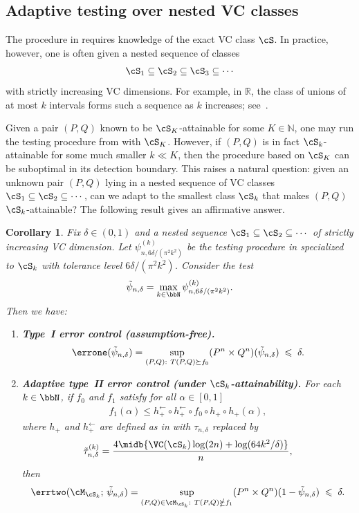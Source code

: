 \documentclass[english]{article}
\theoremstyle{plain}
\newtheorem{corollary}{Corollary}[section]
\theoremstyle{definition}
\newcommand{\hinv}{h_+^{\leftarrow}}
\newcommand{\Toff}[2]{T(#1,#2)}
\newcommand{\hupup}{h_+\mathbin{\circ}h_+}                 %
\newcommand{\hinvinv}{h_+^{\leftarrow}\mathbin{\circ}h_+^{\leftarrow}}  %
\newcommand{\fnull}{f_0}
\newcommand{\falt}{f_1}
\newcommand{\tauND}{\tau_{n,\delta}}               %
\newcommand{\hup}{h_+}                             %
\begin{document}
\subsection{Adaptive testing over nested VC classes}

The procedure in  requires knowledge of the exact VC
class \(\cS\). In practice, however, one is often given a nested sequence of
classes
\begin{align*}
\cS_1\subseteq\cS_2\subseteq \cS_3\subseteq\cdots
\end{align*}
with strictly increasing VC dimensions. For example, in \(\mathbb R\), the class of
unions of at most \(k\) intervals forms such a sequence as \(k\) increases; see~.

Given a pair \((P,Q)\) known to be \(\cS_K\)-attainable for some
\(K\in\mathbb N\), one may run the testing procedure from
 with \(\cS_K\). However, if \((P,Q)\) is in fact
\(\cS_k\)-attainable for some much smaller \(k\ll K\), then the procedure
based on \(\cS_K\) can be suboptimal in its detection boundary. This raises a
natural question: given an unknown pair \((P,Q)\) lying in a nested sequence of
VC classes \(\cS_1\subseteq\cS_2\subseteq\cdots\), can we adapt to the smallest
class \(\cS_k\) that makes \((P,Q)\) \(\cS_k\)-attainable? The following
result gives an affirmative answer.

\begin{corollary}\label{cor:adaptive}
Fix $\delta\in(0,1)$ and a nested sequence
$\cS_1\subseteq\cS_2\subseteq\cdots$ of strictly increasing VC dimension. Let
$\psi^{(k)}_{n,6\delta/(\pi^2k^2)}$ be the testing procedure in
 specialized to \(\cS_k\) with tolerance level
\(6\delta/(\pi^2k^2)\). Consider the test
\begin{align*}
\tilde{\psi}_{n,\delta}=\max_{k\in \bbN}\psi^{(k)}_{n,6\delta/(\pi^2k^2)}.
\end{align*}
Then we have:
\begin{enumerate}[label=(\roman*)]
\item \textbf{Type~I error control (assumption-free).}
\[
\errone(\tilde{\psi}_{n,\delta})
=
\sup_{(P,Q):\ \Toff{P}{Q}\succeq \fnull}
(P^n\times Q^n)(\tilde{\psi}_{n,\delta})
\;\leqslant\;
\delta.
\]

\item \textbf{Adaptive type~II error control (under $\cS_k$-attainability).}
For each \(k\in \bbN\), if \(\fnull\) and \(\falt\) satisfy for all
\(\alpha \in [0,1]\)
\begin{align*}
\falt(\alpha)\leqslant \hinvinv \circ \fnull\circ \hupup(\alpha),
\end{align*}
where \(\hup\) and \(\hinv\) are defined as in  with
\(\tauND\) replaced by
\begin{align*}
\tilde{\tau}^{(k)}_{n,\delta}
=
\frac{4\midb{\VC(\cS_k)\log(2n)+\log(64k^2/\delta)}}{n},
\end{align*}
then
\[
\errtwo(\cM_{\cS_k};\, \tilde{\psi}_{n,\delta})
=
\sup_{(P,Q)\in\cM_{\cS_k}:\ \Toff{P}{Q}\nsucceq \falt}
(P^n\times Q^n)(1-\tilde{\psi}_{n,\delta})
\;\leqslant\;
\delta.
\]
\end{enumerate}
\end{corollary}
\end{document}
